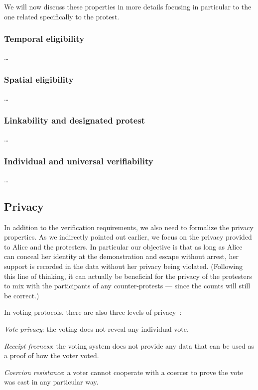 We will now discuss these properties in more details focusing in particular to the one related specifically to the protest.

\subsubsection{Temporal eligibility}

\begin{definition}
  \dots
\end{definition}

\subsubsection{Spatial eligibility}

\begin{definition}
  \dots
\end{definition}

\subsubsection{Linkability and designated protest}

\dots

\subsubsection{Individual and universal verifiability}

\dots

\subsection{Privacy}%
\label{Privacy}

In addition to the verification requirements, we also need to formalize the privacy properties.
As we indirectly pointed out earlier, we focus on the privacy provided to Alice and the protesters.
In particular our objective is that as long as Alice can conceal her identity at the demonstration and escape without arrest, her support is recorded in the data without her privacy being violated.
(Following this line of thinking, it can actually be beneficial for the privacy of the protesters to mix with the participants of any counter-protests --- since the counts will still be correct.)

In voting protocols, there are also three levels of privacy~\cite{VerifyingPrivacyPropertiesOfVotingProtocols}:
\begin{requirements}[P]
\item\label{VotePrivacy} \emph{Vote privacy}: the voting does not reveal any individual vote.
\item\label{ReceiptFreeness} \emph{Receipt freeness}: the voting system does not provide any data that can be used as a proof of how the voter voted.
\item\label{CoercionResistance} \emph{Coercion resistance}: a voter cannot cooperate with a coercer to prove the vote was cast in any particular way.
\end{requirements}

